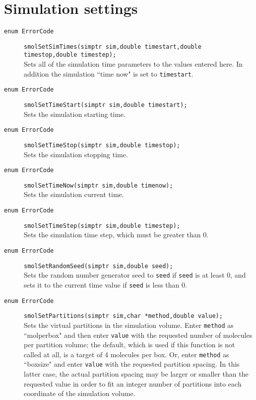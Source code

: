 \documentclass {book}
\begin{document}
\section{Simulation settings}

\begin{description}

\item[\texttt{enum ErrorCode}]
\texttt{smolSetSimTimes(simptr sim,double timestart,double timestop,double timestep);}
\hfill \\
Sets all of the simulation time parameters to the values entered here. In addition the simulation ``time now" is set to \texttt{timestart}.

\item[\texttt{enum ErrorCode}]
\texttt{smolSetTimeStart(simptr sim,double timestart);}
\hfill \\
Sets the simulation starting time.

\item[\texttt{enum ErrorCode}]
\texttt{smolSetTimeStop(simptr sim,double timestop);}
\hfill \\
Sets the simulation stopping time.

\item[\texttt{enum ErrorCode}]
\texttt{smolSetTimeNow(simptr sim,double timenow);}
\hfill \\
Sets the simulation current time.

\item[\texttt{enum ErrorCode}]
\texttt{smolSetTimeStep(simptr sim,double timestep);}
\hfill \\
Sets the simulation time step, which must be greater than 0.

\item[\texttt{enum ErrorCode}]
\texttt{smolSetRandomSeed(simptr sim,double seed);}
\hfill \\
Sets the random number generator seed to \texttt{seed} if \texttt{seed} is at least 0, and sets it to the current time value if \texttt{seed} is less than 0.

\item[\texttt{enum ErrorCode}]
\texttt{smolSetPartitions(simptr sim,char *method,double value);}
\hfill \\
Sets the virtual partitions in the simulation volume. Enter \texttt{method} as ``molperbox" and then enter \texttt{value} with the requested number of molecules per partition volume; the default, which is used if this function is not called at all, is a target of 4 molecules per box. Or, enter \texttt{method} as ``boxsize" and enter \texttt{value} with the requested partition spacing. In this latter case, the actual partition spacing may be larger or smaller than the requested value in order to fit an integer number of partitions into each coordinate of the simulation volume.

\end{description}
\end{document}
